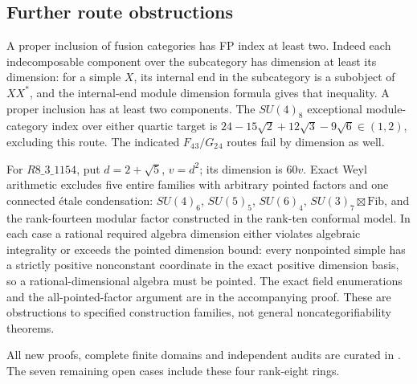 \subsection{Further route obstructions}
A proper inclusion of fusion categories has FP index at least two.
Indeed each indecomposable component over the subcategory has dimension
at least its dimension: for a simple $X$, its internal end in the
subcategory is a subobject of $XX^*$, and the internal-end module
dimension formula gives that inequality. A proper inclusion has at
least two components. The $SU(4)_8$ exceptional module-category index
over either quartic target is
$24-15\sqrt2+12\sqrt3-9\sqrt6\in(1,2)$, excluding this route.
The indicated $F_4{}_3/G_2{}_4$ routes fail by dimension as well.

For $R8\_3\_1154$, put $d=2+\sqrt5$, $v=d^2$; its dimension is $60v$.
Exact Weyl arithmetic excludes five entire families with arbitrary
pointed factors and one connected étale condensation:
$SU(4)_6$, $SU(5)_5$, $SU(6)_4$,
$SU(3)_7\boxtimes\mathrm{Fib}$, and the rank-fourteen modular factor
constructed in the rank-ten conformal model. In each case a rational
required algebra dimension either violates algebraic integrality or
exceeds the pointed dimension bound: every nonpointed simple has a
strictly positive nonconstant coordinate in the exact positive
dimension basis, so a rational-dimensional algebra must be pointed.
The exact field enumerations and the all-pointed-factor argument are
in the accompanying proof. These are obstructions to specified
construction families, not general noncategorifiability theorems.

All new proofs, complete finite domains and independent audits are
curated in .
The seven remaining open cases include these four rank-eight rings.
